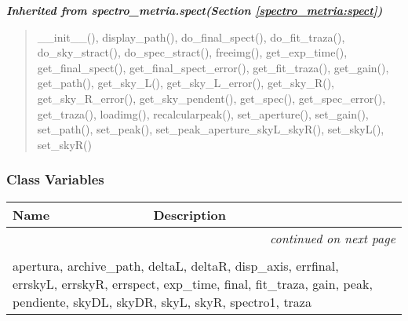 \large{\textbf{\textit{Inherited from spectro\_metria.spect\textit{(Section \ref{spectro_metria:spect})}}}}

\begin{quote}
\_\_init\_\_(), display\_path(), do\_final\_spect(), do\_fit\_traza(), do\_sky\_stract(), do\_spec\_stract(), freeimg(), get\_exp\_time(), get\_final\_spect(), get\_final\_spect\_error(), get\_fit\_traza(), get\_gain(), get\_path(), get\_sky\_L(), get\_sky\_L\_error(), get\_sky\_R(), get\_sky\_R\_error(), get\_sky\_pendent(), get\_spec(), get\_spec\_error(), get\_traza(), loadimg(), recalcularpeak(), set\_aperture(), set\_gain(), set\_path(), set\_peak(), set\_peak\_aperture\_skyL\_skyR(), set\_skyL(), set\_skyR()
\end{quote}


  \subsubsection{Class Variables}

    \vspace{-1cm}
\hspace{\varindent}\begin{longtable}{|p{\varnamewidth}|p{\vardescrwidth}|l}
\cline{1-2}
\cline{1-2} \centering \textbf{Name} & \centering \textbf{Description}& \\
\cline{1-2}
\endhead\cline{1-2}\multicolumn{3}{r}{\small\textit{continued on next page}}\\\endfoot\cline{1-2}
\endlastfoot\multicolumn{2}{|l|}{\textit{Inherited from spectro\_metria.spect \textit{(Section \ref{spectro_metria:spect})}}}\\
\multicolumn{2}{|p{\varwidth}|}{\raggedright apertura, archive\_path, deltaL, deltaR, disp\_axis, errfinal, errskyL, errskyR, errspect, exp\_time, final, fit\_traza, gain, peak, pendiente, skyDL, skyDR, skyL, skyR, spectro1, traza}\\
\cline{1-2}
\end{longtable}

